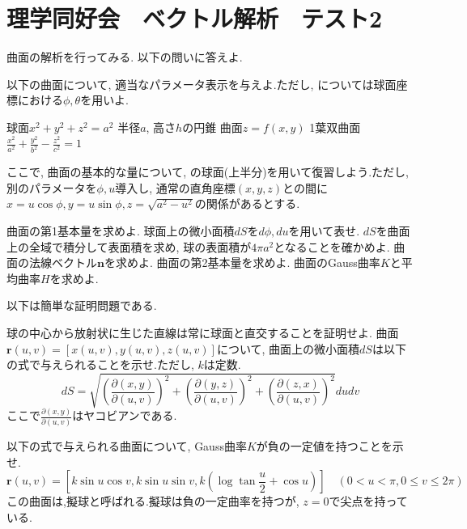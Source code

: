 \documentclass[a4j,dvipdfmx]{jsarticle}
\begin{document}
    \part*{理学同好会　ベクトル解析　テスト2}
        曲面の解析を行ってみる. 以下の問いに答えよ.
        \begin{qparts}
            \qpart 以下の曲面について, 適当なパラメータ表示を与えよ.ただし, については球面座標における$\phi,\theta$を用いよ.
            \begin{qlist}
                \qitem 球面$x^2+y^2+z^2=a^2$ \label{q:球面のパラメータの問}
                \qitem 半径$a$, 高さ$h$の円錐
                \qitem 曲面$z=f(x,y)$
                \qitem 1葉双曲面$\displaystyle \frac{x^2}{a^2}+\frac{y^2}{b^2}-\frac{z^2}{c^2}=1$
            \end{qlist}
            \qpart ここで, 曲面の基本的な量について, の球面(上半分)を用いて復習しよう.ただし, 別のパラメータを$\phi,u$導入し, 通常の直角座標$(x,y,z)$との間に
            $x=u\cos\phi,y=u\sin\phi,z=\sqrt{a^2-u^2}$の関係があるとする.
            \begin{qlist}
                \qitem 曲面の第1基本量を求めよ.
                \qitem 球面上の微小面積$dS$を$d\phi,du$を用いて表せ.
                \qitem $dS$を曲面上の全域で積分して表面積を求め, 球の表面積が$4\pi a^2$となることを確かめよ.
                \qitem 曲面の法線ベクトル$\bm{n}$を求めよ.
                \qitem 曲面の第2基本量を求めよ.
                \qitem 曲面のGauss曲率$K$と平均曲率$H$を求めよ.
            \end{qlist}
            \qpart 以下は簡単な証明問題である.
            \begin{qlist}
                \qitem 球の中心から放射状に生じた直線は常に球面と直交することを証明せよ.
                \qitem 曲面$\bm{r}(u,v)=[x(u,v),y(u,v),z(u,v)]$について, 曲面上の微小面積$dS$は以下の式で与えられることを示せ.ただし, $k$は定数.
                \begin{equation}
                    dS = \sqrt{\left(\frac{\partial(x,y)}{\partial(u,v)}\right)^2+\left(\frac{\partial(y,z)}{\partial(u,v)}\right)^2+\left(\frac{\partial(z,x)}{\partial(u,v)}\right)^2}dudv
                \end{equation}
                ここで$\displaystyle \frac{\partial(x,y)}{\partial(u,v)}$はヤコビアンである.
            \end{qlist}
            \qpart 以下の式で与えられる曲面について, Gauss曲率$K$が負の一定値を持つことを示せ.
                \begin{equation}
                    \bm{r}(u,v)=\left[k\sin u\cos v, k\sin u\sin v,k\left(\log\tan\frac{u}{2}+\cos u\right)\right]\quad (0<u<\pi,0\leq v\leq 2\pi)
                \end{equation}
                この曲面は,擬球と呼ばれる.擬球は負の一定曲率を持つが, $z=0$で尖点を持っている. 
        \end{qparts}
    \clearpage
\end{document}
